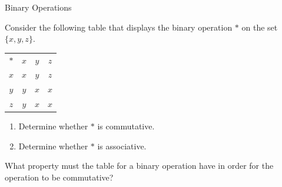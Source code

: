\begin{section}{Binary Operations}
\begin{problem}\label{prob:table}
Consider the following table that displays the binary operation $*$ on the set $\{x,y,z\}$.
\begin{center}
\begin{tabular}{c!{\vrule width 2pt}c|c|c}
$*$ & $x$ & $y$ & $z$ \\ 
$x$ & $x$ & $y$ & $z$ \\
\hline $y$ & $y$ & $x$ & $x$  \\
\hline $z$ & $y$ & $x$ & $x$
\end{tabular}
\end{center}
\begin{enumerate}[label=\textrm{(\alph*)}]
\item Determine whether $*$ is commutative.
\item Determine whether $*$ is associative.
\end{enumerate}
\end{problem}

\begin{problem}
What property must the table for a binary operation have in order for the operation to be commutative?
\end{problem}

\end{section}


